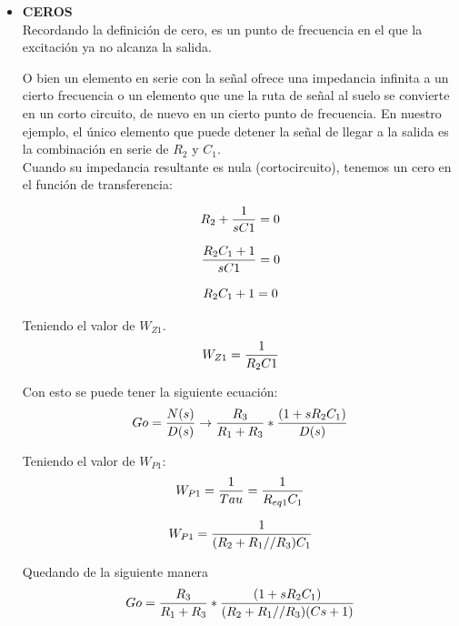 \documentclass[letterpaper,10pt]{article}
\begin{document}
     
    \begin{itemize}
    	\item
    	\textbf{CEROS}\vspace*{0.4in}\\
    	Recordando la definición de cero, es un punto de frecuencia en el que
    	la excitación ya no alcanza la salida.
    	
    	O bien un elemento en serie con la señal ofrece una impedancia infinita a un cierto
    	frecuencia o un elemento que une la ruta de señal al suelo se convierte en un corto
    	circuito, de nuevo en un cierto punto de frecuencia. En nuestro ejemplo, el único elemento que
    	puede detener la señal de llegar a la salida es la combinación en serie de $R_2$ y $C_1$.\\ 
    	Cuando su impedancia resultante es nula (cortocircuito), tenemos un cero en el
    	función de transferencia:
    	
    	\begin{equation}
    	R_2+ \frac{1}{sC1}=0 \\  
    	\end{equation}
    
        \begin{equation}
   	 	\frac{R_2C_1+1}{sC1}=0 \\  
    	\end{equation}
    	
    	\begin{equation}
    	R_2C_1+1=0 \\  
    	\end{equation}
   
    	Teniendo el valor de $W_{Z1}$.
    	\begin{equation}
		W_{Z1}=\frac{1}{R_2C1} \\  
		\end{equation}
		
		Con esto se puede tener la siguiente ecuación:
		\begin{equation}
		Go= \frac {N(s)}{D(s)}\rightarrow \frac {R_3}{R_1 + R_3}*\frac {(1 + sR_2C_1)}{D(s)}\\  
		\end{equation}
		
		Teniendo el valor de $W_{P1}$:
		\begin{equation}
		W_{P1}=\frac {1}{Tau}=\frac {1}{R_{eq1}C_1}\\  
		\end{equation}
		
		\begin{equation}
		W_{P1}=\frac {1}{(R_2+R_1//R_3)C_1}\\  
		\end{equation}
		
		Quedando de la siguiente manera
		\begin{equation}
		Go=\frac {R_3}{R_1 + R_3}*\frac {(1 + sR_2C_1)}{(R_2+R_1//R_3)(Cs+1)}\\  
		\end{equation}
		
		\end{itemize}
\end{document}
